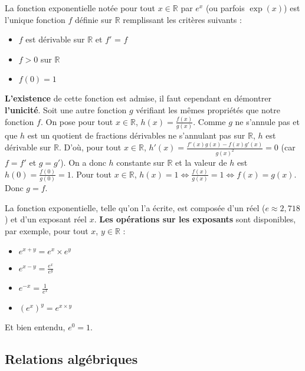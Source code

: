	\begin{formula}[Définition]
		La fonction exponentielle notée pour tout $x \in \mathbb{R}$ par $e^x$ (ou parfois $\exp(x)$) est l'unique fonction $f$ définie sur $\mathbb{R}$ remplissant les critères suivants :
		\begin{itemize}
			\item $f$ est dérivable sur $\mathbb{R}$ et $f'$ = $f$
			\item $f > 0$ sur $\mathbb{R}$
			\item $f(0) = 1$
		\end{itemize}
	\end{formula}
	
	\begin{demonstration}[Existence]
		\textbf{L'existence} de cette fonction est admise, il faut cependant en démontrer \textbf{l'unicité}.
		\newpar
		Soit une autre fonction $g$ vérifiant les mêmes propriétés que notre fonction $f$. On pose pour tout $x \in \mathbb{R}$, $h(x) = \frac{f(x)}{g(x)}$.
		\newpar
		Comme $g$ ne s'annule pas et que $h$ est un quotient de fractions dérivables ne s'annulant pas sur $\mathbb{R}$, $h$ est dérivable sur $\mathbb{R}$.
		\newpar
		D'où, pour tout $x \in \mathbb{R}$, $h'(x) = \frac{f'(x)g(x) - f(x)g'(x)}{g(x)^2} = 0$ (car $f = f'$ et $g = g'$).
		\newpar
		On a donc $h$ constante sur $\mathbb{R}$ et la valeur de $h$ est $h(0) = \frac{f(0)}{g(0)} = 1$.
		\newpar
		Pour tout $x \in \mathbb{R}$, $h(x) = 1 \iff \frac{f(x)}{g(x)} = 1 \iff f(x) = g(x)$. Donc $g = f$.
	\end{demonstration}
	
	\begin{tip}[Formules]
		La fonction exponentielle, telle qu'on l'a écrite, est composée d'un réel ($e \approx 2,718 $) et d'un exposant réel $x$. \textbf{Les opérations sur les exposants} sont disponibles, par exemple, pour tout $x$, $y \in \mathbb{R}$ :
		\begin{itemize}
			\item $e^{x+y} = e^x \times e^y$
			\item $e^{x-y} = \frac{e^x}{e^y}$
			\item $e^{-x} = \frac{1}{e^x}$
			\item $(e^x)^y = e^{x \times y}$
		\end{itemize}
		Et bien entendu, $e^0 = 1$.
	\end{tip}
	
	\subsection{Relations algébriques}
	
